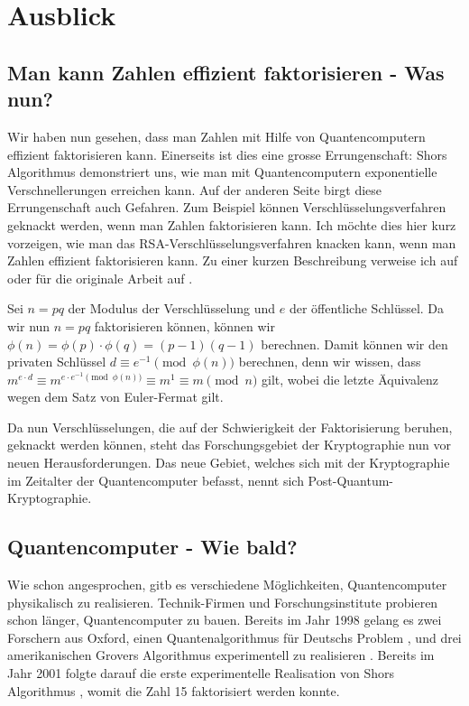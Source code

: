 \chapter{Ausblick}
\section{Man kann Zahlen effizient faktorisieren - Was nun?}
Wir haben nun gesehen, dass man Zahlen mit Hilfe von Quantencomputern effizient faktorisieren kann. Einerseits ist dies eine grosse Errungenschaft: Shors Algorithmus demonstriert uns, wie man mit Quantencomputern exponentielle Verschnellerungen erreichen kann. Auf der anderen Seite birgt diese Errungenschaft auch Gefahren. Zum Beispiel können Verschlüsselungsverfahren geknackt werden, wenn man Zahlen faktorisieren kann. Ich möchte dies hier kurz vorzeigen, wie man das RSA-Verschlüsselungsverfahren knacken kann, wenn man Zahlen effizient faktorisieren kann. Zu einer kurzen Beschreibung verweise ich auf \cite{rsaintro} oder für die originale Arbeit auf \cite{rsaorig}. 

Sei $n = pq$ der Modulus der Verschlüsselung und $e$ der öffentliche Schlüssel. Da wir nun $n = pq$ faktorisieren können, können wir $\phi(n) = \phi(p)\cdot\phi(q) = (p - 1)(q - 1)$ berechnen. Damit können wir den privaten Schlüssel $d \equiv e^{-1} \pmod{\phi(n)}$ berechnen, denn wir wissen, dass $m^{e\cdot d} \equiv m^{e\cdot e^{-1} \pmod{\phi(n)}} \equiv m^1 \equiv m \pmod{n}$ gilt, wobei die letzte Äquivalenz wegen dem Satz von Euler-Fermat gilt.

Da nun Verschlüsselungen, die auf der Schwierigkeit der Faktorisierung beruhen, geknackt werden können, steht das Forschungsgebiet der Kryptographie nun vor neuen Herausforderungen. Das neue Gebiet, welches sich mit der Kryptographie im Zeitalter der Quantencomputer befasst, nennt sich Post-Quantum-Kryptographie.

\section{Quantencomputer - Wie bald?}
Wie schon angesprochen, gitb es verschiedene Möglichkeiten, Quantencomputer physikalisch zu realisieren. Technik-Firmen und Forschungsinstitute probieren schon länger, Quantencomputer zu bauen. Bereits im Jahr 1998 gelang es zwei Forschern aus Oxford, einen Quantenalgorithmus für Deutschs Problem \cite{qimpdj}, und drei amerikanischen Grovers Algorithmus experimentell zu realisieren \cite{qimpgr}. Bereits im Jahr 2001 folgte darauf die erste experimentelle Realisation von Shors Algorithmus \cite{ShorImp}, womit die Zahl 15 faktorisiert werden konnte.

